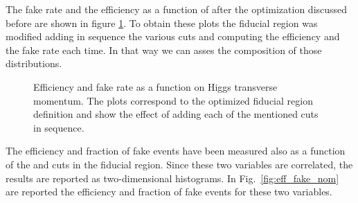 The fake rate and the efficiency as a function of \pth after the optimization discussed before are shown in figure \ref{fig:eff_fake_comp}. To obtain these plots the fiducial region was modified adding in sequence the various cuts and computing the efficiency and the fake rate each time. In that way we can asses the composition of those distributions.

\begin{figure}[htb]
\centering
{}
\caption{Efficiency and fake rate as a function on Higgs transverse momentum. The plots correspond to the optimized fiducial region definition and show the effect of adding each of the mentioned cuts in sequence.}\label{fig:eff_fake_comp}
\end{figure}

The efficiency and fraction of fake events have been measured also as a function of the \MET and \mt cuts in the fiducial region. Since these two variables are correlated, the results are reported as two-dimensional histograms. In Fig.~\ref{fig:eff_fake_nom} are reported the efficiency and fraction of fake events for these two variables.

